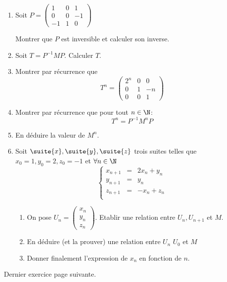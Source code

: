 \documentclass[a4paper, 11pt,reqno]{article}
\begin{document}
\begin{exercice}
\begin{enumerate}
\item Soit $P= \left(
\begin{array}{ccc}
1&0&1\\
0&0&-1\\
-1&1&0
\end{array}
 \right)$ 
 
 Montrer que $P$ est inversible et calculer son inverse. 
 \item Soit $T=P^{-1}MP$. Calculer $T$. 
  \item Montrer par récurrence que 
$$T^n = \left(\begin{array}{ccc}  
2^n&0&0 \\
0 &1&-n \\
0&0&1 
\end{array}\right)$$
 \item Montrer par récurrence que pour tout $n\in \N$: 
 $$T^n = P^{-1}M^n P$$
\item En déduire la valeur de $M^n$.
\item Soit $\suite{x}, \suite{y}, \suite{z}$ trois suites telles que $x_0=1, y_0=2, z_0=-1$ et $\forall n\in \N$
$$\left\{ \begin{array}{ccc}
x_{n+1} &=& 2x_n+y_n\\
y_{n+1} &= & y_n\\
z_{n+1} &= & -x_n+z_n\\
\end{array}\right.$$
\begin{enumerate}
\item On pose $U_n =\left(\begin{array}{c}
x_n\\
y_n\\
z_n
\end{array}   \right)$. Etablir une relation entre $U_n, U_{n+1}$ et $M$.
\item En déduire  (et la prouver) une relation entre $U_n$ $U_0$ et $M$
\item Donner finalement l'expression de $x_n$ en fonction de $n$. 
\end{enumerate}

\end{enumerate}
\end{exercice}

\vspace{3cm}
\begin{center}
Dernier exercice page suivante.
\end{center}
\end{document}
